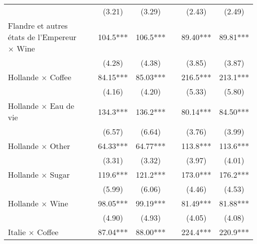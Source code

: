 {\begin{tabular}{l*{6}{c}}
                    &                     &      (3.21)         &      (3.29)         &                     &      (2.43)         &      (2.49)         \\
[1em]
Flandre et autres états de l'Empereur $\times$ Wine&                     &       104.5***&       106.5***&                     &       89.40***&       89.81***\\
                    &                     &      (4.28)         &      (4.38)         &                     &      (3.85)         &      (3.87)         \\
[1em]
Hollande $\times$ Coffee&                     &       84.15***&       85.03***&                     &       216.5***&       213.1***\\
                    &                     &      (4.16)         &      (4.20)         &                     &      (5.33)         &      (5.80)         \\
[1em]
Hollande $\times$ Eau de vie&                     &       134.3***&       136.2***&                     &       80.14***&       84.50***\\
                    &                     &      (6.57)         &      (6.64)         &                     &      (3.76)         &      (3.99)         \\
[1em]
Hollande $\times$ Other&                     &       64.33***&       64.77***&                     &       113.8***&       113.6***\\
                    &                     &      (3.31)         &      (3.32)         &                     &      (3.97)         &      (4.01)         \\
[1em]
Hollande $\times$ Sugar&                     &       119.6***&       121.2***&                     &       173.0***&       176.2***\\
                    &                     &      (5.99)         &      (6.06)         &                     &      (4.46)         &      (4.53)         \\
[1em]
Hollande $\times$ Wine&                     &       98.05***&       99.19***&                     &       81.49***&       81.88***\\
                    &                     &      (4.90)         &      (4.93)         &                     &      (4.05)         &      (4.08)         \\
[1em]
Italie $\times$ Coffee&                     &       87.04***&       88.00***&                     &       224.4***&       220.9***\\

\end{tabular}}
